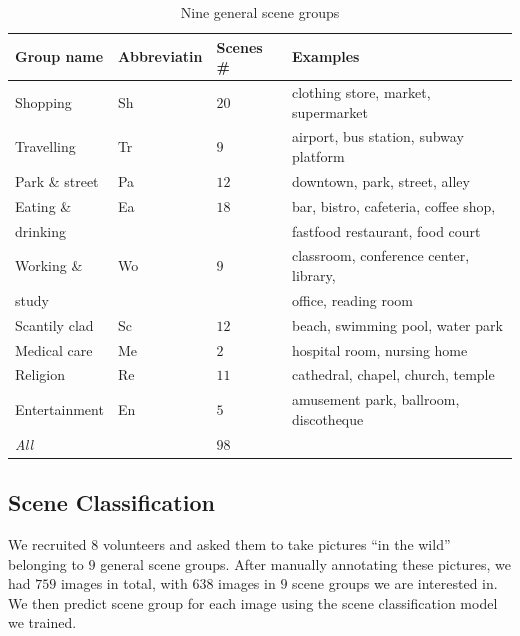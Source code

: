 \begin{table}[tb]
\centering
\caption{Nine general scene groups}
\label{tbl-scenecateupdate}
\begin{tabular}{llll}
\toprule
\textbf{Group name}  & \textbf{Abbreviatin}    & \textbf{Scenes \#}     & \textbf{Examples}   \\ \midrule
Shopping        &Sh & $20$            & clothing store, market, supermarket\\ \midrule
Travelling      &Tr & $9$             & airport, bus station, subway platform\\ \midrule
Park \& street  &Pa & $12$            & downtown, park, street, alley\\ \midrule
Eating \&       &Ea & $18$            & bar, bistro, cafeteria, coffee shop,\\
drinking        & &                 & fastfood restaurant, food court\\ \midrule
Working \&      &Wo & $9$             & classroom, conference center, library,\\
study           & &                 & office, reading room\\ \midrule
Scantily clad   &Sc & $12$            & beach, swimming pool, water park\\ \midrule
Medical care    &Me & $2$             & hospital room, nursing home\\ \midrule
Religion        &Re & $11$            & cathedral, chapel, church, temple\\ \midrule
Entertainment   &En & $5$             & amusement park, ballroom, discotheque\\ \midrule
\textit{All}    & & $\mathit{98}$   &   \\ \bottomrule
\end{tabular}
\end{table}

\subsection{Scene Classification}


We recruited $8$ volunteers and asked them to take pictures ``in the wild'' belonging to $9$ general scene groups. After manually annotating these pictures, we had $759$ images in total, with $638$ images in $9$ scene groups we are interested in. We then predict scene group for each image using the scene classification model we trained.


